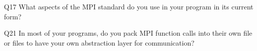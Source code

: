 \begin{description}%
\item{Q17} What aspects of the MPI standard do you use in your program in its current form?%
\item{Q21} In most of your programs, do you pack MPI function calls into their own file or files to have your own abstraction layer for communication?%
\end{description}%

